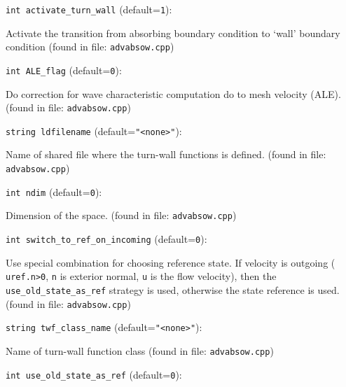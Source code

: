 \item\verb+int activate_turn_wall+ {\rm(default=\verb|1|)}:

Activate the transition from absorbing boundary condition
 to `wall' boundary condition
 (found in file: \verb+advabsow.cpp+)
\item\verb+int ALE_flag+ {\rm(default=\verb|0|)}:

Do correction for wave characteristic computation
 do to mesh velocity (ALE).
 (found in file: \verb+advabsow.cpp+)
\item\verb+string ldfilename+ {\rm(default=\verb|"<none>"|)}:

Name of shared file where the turn-wall
 functions is defined. 
 (found in file: \verb+advabsow.cpp+)
\item\verb+int ndim+ {\rm(default=\verb|0|)}:

Dimension of the space.
 (found in file: \verb+advabsow.cpp+)
\item\verb+int switch_to_ref_on_incoming+ {\rm(default=\verb|0|)}:

Use special combination for choosing reference state.
 If velocity is outgoing ( \verb+uref.n>0+, \verb+n+ is exterior
 normal, \verb+u+ is the flow velocity), then the
 \verb+use_old_state_as_ref+ strategy is used, otherwise the
 state reference is used. 
 (found in file: \verb+advabsow.cpp+)
\item\verb+string twf_class_name+ {\rm(default=\verb|"<none>"|)}:

Name of turn-wall function class
 (found in file: \verb+advabsow.cpp+)
\item\verb+int use_old_state_as_ref+ {\rm(default=\verb|0|)}:

